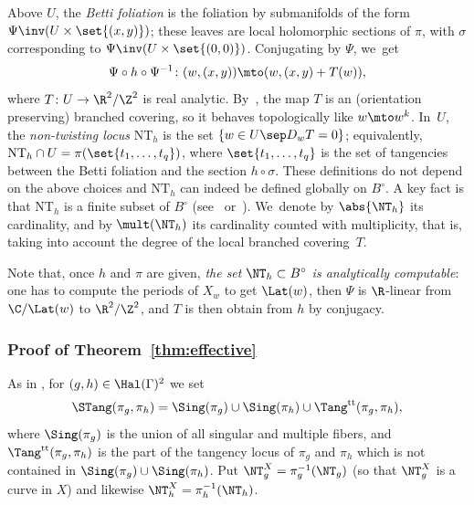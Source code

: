 Above $U$, the \emph{Betti foliation} is the foliation by
submanifolds of the form $\Psi\inv(U\times\nobreak \set{(x,y)})$; these leaves are local holomorphic sections of $\pi$, with $\sigma$ corresponding to $\Psi\inv(U\times \set{(0,0)})$.
Conjugating by
$\Psi$, we~get
\begin{equation}\label{eq:definition_T}
\Psi\circ h\circ \Psi^{-1}\colon (w, (x,y))\mto (w, (x,y)+T(w)),
\end{equation}
where $T\colon U\to \R^2/\Z^2$ is real analytic. By~\cite[Lem.\,3.9]{invariant}, the map $T$
is an (orientation preserving)
branched covering, so it behaves topologically like $w\mto w^k$. In~$U$, the
\emph{non-twisting locus} $\mathrm{NT}_{h}$
is the set $\{w\in U\sep  D_wT = 0\}$; equivalently, $\mathrm{NT}_{h }\cap U = \pi(\set{t_1, \ldots , t_q})$, where
$\set{t_1, \ldots , t_q}$ is the set of tangencies between
the Betti foliation and the section $h \circ \sigma$. These definitions do not depend on the above choices and $\mathrm{NT}_{h}$ can indeed be defined globally on $B^\circ$.
A key fact is that $\mathrm{NT}_{h}$ is a finite subset of $B^\circ$
(see~\cite[Prop.\,3.14]{invariant} or~\cite[Cor.\,7.7.10]{duistermaat}). We~denote by $\abs{\NT_h}$ its cardinality, and by $\mult(\NT_h)$
its cardinality counted with multiplicity, that is, taking into account the
degree of the local branched covering~$T$.

Note that, once $h$ and $\pi$ are given, {\textit{the set $\NT_h\subset B^\circ$ is analytically computable}}: one has to compute the periods of $X_w$
to get $\Lat(w)$, then $\Psi$ is $\R$-linear from $\C/\Lat(w)$ to $\R^2/\Z^2$, and $T$ is then obtain from $h$ by conjugacy.

\subsubsection{Proof of Theorem~\ref{thm:effective}}
As in \cite{invariant}, for $(g,h)\in \Hal(\Gamma)^2$
we set
\begin{equation*}
\STang(\pi_g, \pi_h) =
\Sing(\pi_g)\cup\Sing (\pi_h)\cup \Tang^{\mathrm{tt}}(\pi_g, \pi_h),
\end{equation*}
where $\Sing(\pi_g)$ is the union of all singular and multiple fibers, and
$\Tang^{\mathrm{tt}}(\pi_g, \pi_h)$ is the part of the tangency locus of $\pi_g$ and $\pi_h$ which is not contained in $\Sing(\pi_g)\cup\Sing (\pi_h)$.
Put $\NT_g^X=\pi_g^{-1}(\NT_g)$ (so that $\NT_g^X$ is a curve in $X$) and
likewise $\NT_h^X=\pi_h^{-1}(\NT_h)$.

